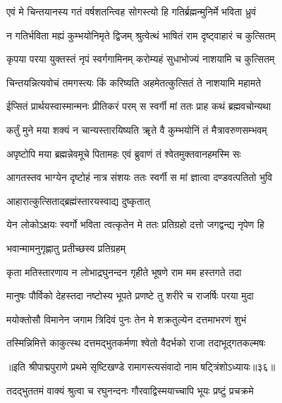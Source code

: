 \twolineshloka
{एवं मे चिन्तयानस्य गतं वर्षशतन्त्विह}
{सोगस्त्यो हि गतिर्ब्रह्मन्मुनिर्मे भविता ध्रुवं}%

\twolineshloka
{न गतिर्भविता मह्यं कुम्भयोनिमृते द्विजम्}
{श्रुत्वेत्थं भाषितं राम दृष्ट्वाहारं च कुत्सितम्}%

\twolineshloka
{कृपया परया युक्तस्तं नृपं स्वर्गगामिनम्}
{करोम्यहं सुधाभोज्यं नाशयामि च कुत्सितम्}%

\twolineshloka
{चिन्तयन्नित्यवोचं तमगस्त्यः किं करिष्यति}
{अहमेतत्कुत्सितं ते नाशयामि महामते}%

\twolineshloka
{ईप्सितं प्रार्थयस्वास्मान्मनः प्रीतिकरं परम्}
{स स्वर्गी मां ततः प्राह कथं ब्रह्मवचोन्यथा}%

\twolineshloka
{कर्तुं मुने मया शक्यं न चान्यस्तारयिष्यति}
{ॠते वै कुम्भयोनिं तं मैत्रावरुणसम्भवम्}%

\twolineshloka
{अपृष्टोपि मया ब्रह्मन्नेवमूचे पितामहः}
{एवं ब्रुवाणं तं श्वेतमुक्तवानहमस्मि सः}%

\twolineshloka
{आगतस्तव भाग्येन दृष्टोहं नात्र संशयः}
{ततः स्वर्गी स मां ज्ञात्वा दण्डवत्पतितो भुवि}%



\onelineshloka
{आहारात्कुत्सिताद्ब्रह्मंस्तारयस्वाद्य दुष्कृतात्}%

\twolineshloka
{येन लोकोऽक्षयः स्वर्गो भविता त्वत्कृतेन मे}
{ततः प्रतिग्रहो दत्तो जगद्वन्द्य नृपेण हि}%


\onelineshloka
{भवान्मामनुगृह्णातु प्रतीच्छस्व प्रतिग्रहम्}%

\twolineshloka
{कृता मतिस्तारणाय न लोभाद्रघुनन्दन}
{गृहीते भूषणे राम मम हस्तगते तदा}%

\twolineshloka
{मानुषः पौर्विको देहस्तदा नष्टोस्य भूपते}
{प्रणष्टे तु शरीरे च राजर्षिः परया मुदा}%

\twolineshloka
{मयोक्तोसौ विमानेन जगाम त्रिदिवं पुनः}
{तेन मे शक्रतुल्येन दत्तमाभरणं शुभं}%

\twolineshloka
{तस्मिन्निमित्ते काकुत्स्थ दत्तमद्भुतकर्मणा}
{श्वेतो वैदर्भको राजा तदाभूद्गतकल्मषः}%

॥इति श्रीपाद्मपुराणे प्रथमे सृष्टिखण्डे रामागस्त्यसंवादो नाम षट्त्रिंशोऽध्यायः॥३६॥



\twolineshloka
{तदद्भुततमं वाक्यं श्रुत्वा च रघुनन्दनः}
{गौरवाद्विस्मयाच्चापि भूयः प्रष्टुं प्रचक्रमे}%

